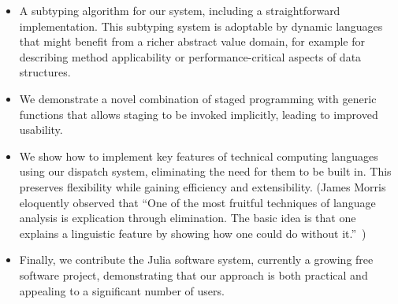 \begin{itemize}



\item A subtyping algorithm for our system, including a straightforward
implementation.
This subtyping system is adoptable by dynamic languages that might
benefit from a richer abstract value domain, for example for
describing method applicability or performance-critical aspects of data structures.





\item We demonstrate a novel combination of staged programming with generic
functions that allows staging to be invoked implicitly, leading to improved
usability.


\item We show how to implement key features of technical computing languages
using our dispatch system, eliminating the need for them to be built in.
This preserves flexibility while gaining efficiency and extensibility.
(James Morris eloquently observed that
``One of the most fruitful techniques of language analysis is explication through
elimination.
The basic idea is that one explains a linguistic feature by showing
how one could do without it.''~\cite{morris})



\item Finally, we contribute the Julia software system, currently a
growing free software project, demonstrating that our approach is both practical
and appealing to a significant number of users.

\end{itemize}
